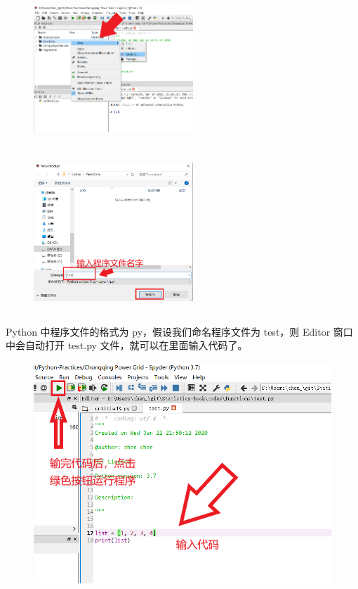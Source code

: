 \begin{figure}[!ht]
  \centering
  \includegraphics[width=6cm, height=6cm]{figure/function1.png}~~~~
  \includegraphics[width=6cm, height=6cm]{figure/function2.png}
\end{figure}


Python 中程序文件的格式为 py，假设我们命名程序文件为 test，则 Editor 窗口中会自动打开 test.py 文件，就可以在里面输入代码了。


\begin{figure}[!ht]
  \centering
  \includegraphics[scale = 0.3]{figure/function3.png}
\end{figure}

